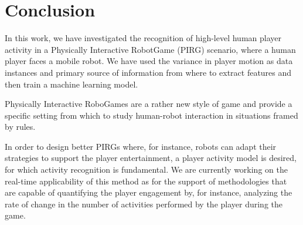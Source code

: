 \section{Conclusion}
In this work, we have investigated the recognition of high-level human player activity in a Physically Interactive RobotGame (PIRG) scenario, where a human player faces a mobile robot. We have used the variance in player motion as data instances and primary source of information from where to extract features and then train a machine learning model. 

Physically Interactive RoboGames are a rather new style of game and provide a specific setting from which to study human-robot interaction in situations framed by rules.

In order to design better PIRGs where, for instance, robots can adapt their strategies to support the player entertainment, a player activity model is desired, for which activity recognition is fundamental. We are currently working on the real-time applicability of this method as for the support of methodologies that are capable of quantifying the player engagement by, for instance, analyzing the rate of change in the number of activities performed by the player during the game.
